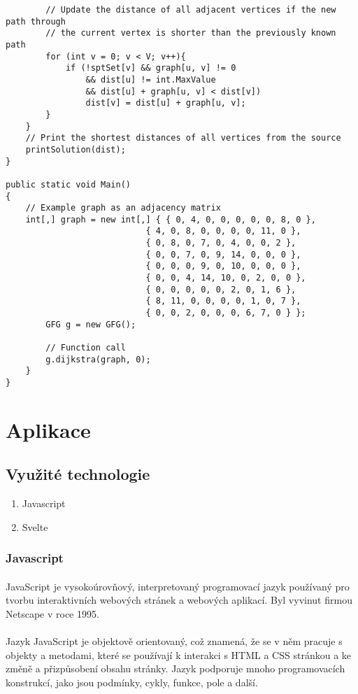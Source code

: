 \documentclass[12pt, titlepage, a4paper]{article}
\begin{document}
\begin{lstlisting}
        // Update the distance of all adjacent vertices if the new path through
        // the current vertex is shorter than the previously known path
        for (int v = 0; v < V; v++){
            if (!sptSet[v] && graph[u, v] != 0
                && dist[u] != int.MaxValue
                && dist[u] + graph[u, v] < dist[v])
                dist[v] = dist[u] + graph[u, v];
        }
    }
    // Print the shortest distances of all vertices from the source
    printSolution(dist);
}

public static void Main()
{
    // Example graph as an adjacency matrix
    int[,] graph = new int[,] { { 0, 4, 0, 0, 0, 0, 0, 8, 0 },
                            { 4, 0, 8, 0, 0, 0, 0, 11, 0 },
                            { 0, 8, 0, 7, 0, 4, 0, 0, 2 },
                            { 0, 0, 7, 0, 9, 14, 0, 0, 0 },
                            { 0, 0, 0, 9, 0, 10, 0, 0, 0 },
                            { 0, 0, 4, 14, 10, 0, 2, 0, 0 },
                            { 0, 0, 0, 0, 0, 2, 0, 1, 6 },
                            { 8, 11, 0, 0, 0, 0, 1, 0, 7 },
                            { 0, 0, 2, 0, 0, 0, 6, 7, 0 } };
        GFG g = new GFG();
 
        // Function call
        g.dijkstra(graph, 0);
    }
}
\end{lstlisting}
\section{Aplikace}
\subsection{Využité technologie}
\begin{enumerate}
    \item Javascript
    \item Svelte
\end{enumerate}
\subsubsection{Javascript}
\paragraph{}
JavaScript je vysokoúrovňový, interpretovaný programovací jazyk používaný pro tvorbu interaktivních
webových stránek a webových aplikací. Byl vyvinut firmou Netscape v roce 1995.
\paragraph{}
Jazyk JavaScript je objektově orientovaný, což znamená, že se v něm pracuje s objekty a metodami,
které se používají k interakci s HTML a CSS stránkou a ke změně a přizpůsobení obsahu stránky.
Jazyk podporuje mnoho programovacích konstrukcí, jako jsou podmínky, cykly, funkce, pole a další.
\end{document}
